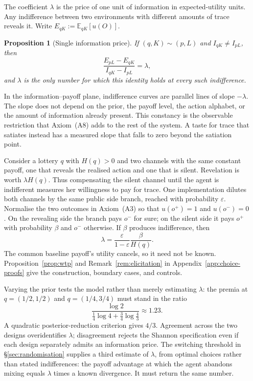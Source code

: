 \documentclass[11pt,a4paper]{article}
\newtheorem{proposition}[theorem]{Proposition}
\theoremstyle{definition}
\newcommand{\E}{\mathbb E}
\newcommand{\I}{I}
\newcommand{\Sh}{H}
\newcommand{\1}{\mathbf 1}
\begin{document}
The coefficient $\lambda$ is the price of one unit of information in expected-utility units.  Any indifference
between two environments with different amounts of trace reveals it.  Write $E_{qK}:=\E_{qK}[u(O)]$.

\begin{proposition}[Single information price]\label{prop:single-price}
If $(q,K)\sim(p,L)$ and $\I_{qK}\ne\I_{pL}$, then
\[
 \frac{E_{pL}-E_{qK}}{\I_{qK}-\I_{pL}}=\lambda,
\]
and $\lambda$ is the only number for which this identity holds at every such indifference.
\end{proposition}

In the information--payoff plane, indifference curves are parallel lines of slope $-\lambda$.  The slope does
not depend on the prior, the payoff level, the action alphabet, or the amount of information already present.
This constancy is the observable restriction that Axiom~\textup{(A8)} adds to the rest of the system.  A taste
for trace that satiates instead has a measured slope that falls to zero beyond the satiation point.

Consider a lottery $q$ with $\Sh(q)>0$ and two channels with the same constant payoff, one that reveals the
realised action and one that is silent.  Revelation is worth $\lambda\Sh(q)$.  Thus compensating the silent
channel until the agent is indifferent measures her willingness to pay for trace.  One implementation dilutes
both channels by the same public side branch, reached with probability $\varepsilon$.  Normalise the two
outcomes in Axiom~\textup{(A3)} so that $u(o^+)=1$ and $u(o^-)=0$.  On the revealing side the branch pays $o^-$
for sure; on the silent side it pays $o^+$ with probability $\beta$ and $o^-$ otherwise.  If $\beta$ produces
indifference, then
\[
 \lambda=\frac{\varepsilon}{1-\varepsilon}\frac{\beta}{\Sh(q)}.
\]
The common baseline payoff's utility cancels, so it need not be known.  Proposition~\ref{prop:wtp} and
Remark~\ref{rem:elicitation} in Appendix~\ref{app:choice-proofs} give the construction, boundary cases, and
controls.

Varying the prior tests the model rather than merely estimating $\lambda$: the premia at $q=(1/2,1/2)$ and
$q=(1/4,3/4)$ must stand in the ratio
\[
 \frac{\log 2}{\frac14\log4+\frac34\log\frac43}
 \approx1.23.
\]
A quadratic posterior-reduction criterion gives $4/3$.  Agreement across the two designs overidentifies
$\lambda$; disagreement rejects the Shannon specification even if each design separately admits an information
price.  The switching threshold in \S\ref{sec:randomisation} supplies a third estimate of $\lambda$, from
optimal choices rather than stated indifferences: the payoff advantage at which the agent abandons mixing equals
$\lambda$ times a known divergence.  It must return the same number.
\end{document}
